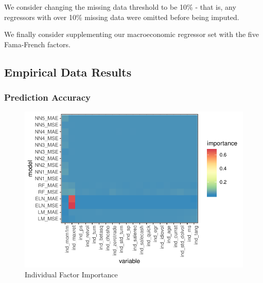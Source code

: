 \documentclass{article}
\begin{document}
We consider changing the missing data threshold to be 10\% - that is, any regressors with over 10\% missing data were omitted before being imputed.

We finally consider supplementing our macroeconomic regressor set with the five Fama-French factors. 

\subsection{Empirical Data Results}


\subsubsection{Prediction Accuracy}



\begin{figure}
	\includegraphics[]{../../Results/empirical/empirical_all_sample_vi_ind.pdf}
	\caption{Individual Factor Importance}
\end{figure}
\end{document}
